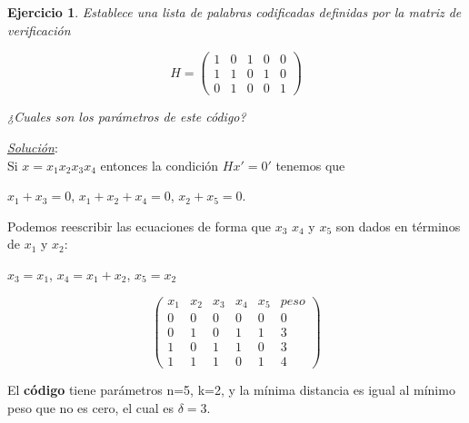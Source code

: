 \documentclass{beamer}
\theoremstyle{plain}
\theoremstyle{example}
\newtheorem{ejercicio} [Ejercicio]{Ejercicio}
\theoremstyle{example}
\begin{document}
\begin{frame}  \small \begin{ejercicio} 

Establece una lista de palabras codificadas definidas por la matriz de verificación

\[
H=  \left( \begin{array}{ccccc}
                  1 & 0 & 1 & 0 & 0\\
                  1 & 1 & 0 & 1 & 0\\
                  0 & 1 & 0 & 0 & 1
           			\end{array}
    		\right) 	    		
\]

¿Cuales son los parámetros de este código?

\end{ejercicio} 


 \end{frame} 

\begin{frame}  \footnotesize

 \textit{\underline{Solución}}:\\
Si $x = x_1x_2x_3x_4$ entonces la condición $Hx' = 0'$ tenemos que  

\begin{center}
$x_1 +x_3 =0$,	$x_1 +x_2 +x_4 =0$,	$x_2 +x_5 =0.$
\end{center}

Podemos reescribir las ecuaciones de forma que $x_3$ $x_4$ y $x_5$ son dados en términos de $x_1$ y $x_2$:

\begin{center}
$x_3 = x_1$,	$x_4 = x_1 + x_2$, $x_5 = x_2$
\end{center}

\[
        \left( \begin{array}{cccccc}
                  x_1 & x_2 & x_3 & x_4 & x_5 & peso\\
                      0 &   0   &   0  &    0 &   0  &0\\  
					  0 &   1   &   0  &    1 &   1  &3\\ 
					  1 &   0   &   1  &    1 &   0  &3\\ 
					  1 &   1   &   1  &    0 &   1  &4
           			\end{array}
    		\right) 	    		
\]

El \textbf{código} tiene parámetros n=5, k=2, y la mínima distancia es igual al mínimo peso que no es cero, el cual es $\delta =3$.


 \end{frame} 
\end{document}
